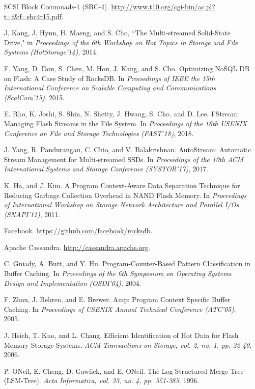 \begin{thebibliography}{00}
SCSI Block Commnads-4 (SBC-4).
\url{http://www.t10.org/cgi-bin/ac.pl?t=f&f=sbc4r15.pdf}.

J. Kang, J. Hyun, H. Maeng, and S. Cho,
``The Multi-streamed Solid-State Drive,"
in \emph{Proceedings of the 6th Workshop on Hot Topics in Storage and File Systems (HotStorage'14)}, 2014.

F. Yang, D. Dou, S. Chen, M. Hou, J. Kang, and S. Cho.
Optimizing NoSQL DB on Flash: A Case Study of RocksDB.
In \textit{Proceedings of IEEE the 15th International Conference on Scalable Computing
and Communications (ScalCom'15)}. 2015.

E. Rho, K. Joshi, S. Shin, N. Shetty, J. Hwang, S. Cho. and D. Lee. 
FStream: Managing Flash Streams in the File System.
In \textit{Proceedings of the 16th USENIX Conference on File and Storage Technologies (FAST'18)}, 2018.

J. Yang, R. Pandurangan, C. Chio, and V. Balakrishnan.
AutoStream: Automatic Stream Management for Multi-streamed SSDs.
In \textit{Proceedings of the 10th ACM International Systems and Storage Conference (SYSTOR'17)}, 2017.

K. Ha, and J. Kim.
A Program Context-Aware Data Separation Technique for Reducing Garbage Collection Overhead in NAND Flash Memory.
In \textit{Proceedings of International Workshop on Storage Network Architecture 
and Parallel I/Os (SNAPI'11)}, 2011.

Facebook. 
\url{https://github.com/facebook/rocksdb}.

Apache Cassandra. 
\url{http://cassandra.apache.org}.

C. Gniady, A. Butt, and Y. Hu.
Program-Counter-Based Pattern Classification in Buffer Caching.
In \textit{Proceedings of the 6th Symposium on Operating Systems Design and Implementation (OSDI'04)}, 2004.

F. Zhou, J. Behren, and E. Brewer.
Amp: Program Context Specific Buffer Caching.
In \textit{Proceedings of USENIX Annual Technical Conference (ATC'05)}, 2005.

J. Hsieh, T. Kuo, and L. Chang.
Efficient Identification of Hot Data for Flash Memory Storage Systems.
\textit{ACM Transactions on Storage, vol. 2, no. 1, pp. 22-40}, 2006.

P. ONeil, E. Cheng, D. Gawlick, and E. ONeil.
The Log-Structured Merge-Tree (LSM-Tree).
\textit{Acta Informatica, vol. 33, no. 4, pp. 351-385}, 1996.


\end{thebibliography}
